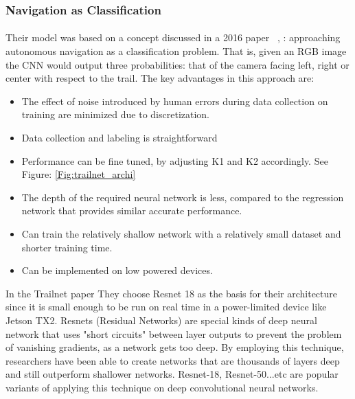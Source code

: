 \newpage
\subsubsection{Navigation as Classification} 

\paragraph{}
Their model was based on a concept discussed in a 2016 paper ~\cite{trailnet},
: approaching autonomous navigation as a classification problem. That is, given an RGB image the CNN would output three probabilities: that of the camera facing left, right or center with respect to the trail. The key advantages in this approach are:

\begin{itemize}
    \item The effect of noise introduced by human errors during data collection on training are minimized due to discretization.
    \item Data collection and labeling is straightforward
    \item Performance can be fine tuned, by adjusting K1 and K2 accordingly. See Figure: \ref{Fig:trailnet_archi}
    \item The depth of the required neural network is less, compared to the regression network that provides similar accurate performance.
    \item Can train the relatively shallow network with a relatively small dataset and shorter training time.
    \item Can be implemented on low powered devices.
\end{itemize}

In the Trailnet paper %
They choose Resnet 18 as the basis for their architecture since it is small enough to be run on real time in a power-limited device like Jetson TX2. Resnets (Residual Networks) are special kinds of deep neural network that uses "short circuits" between layer outputs to prevent the problem of vanishing gradients, as a network gets too deep. By employing this technique, researchers have been able to create networks that are thousands of layers deep and still outperform shallower networks. Resnet-18, Resnet-50...etc are popular variants of applying this technique on deep convolutional neural networks.

